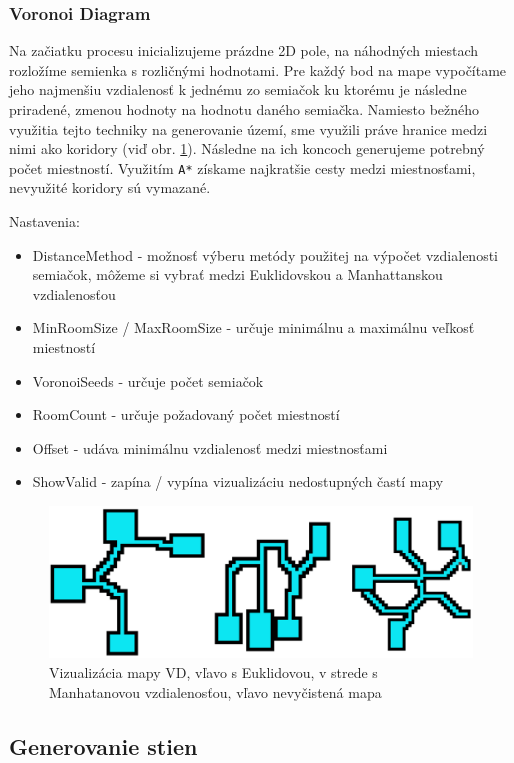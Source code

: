 \subsubsection*{Voronoi Diagram}

Na začiatku procesu inicializujeme prázdne 2D pole, na náhodných miestach rozložíme semienka s rozličnými hodnotami. Pre každý bod na mape vypočítame jeho najmenšiu vzdialenosť k jednému zo semiačok ku ktorému je následne priradené, zmenou hodnoty na hodnotu daného semiačka. Namiesto bežného využitia tejto techniky na generovanie území, sme využili práve hranice medzi nimi ako koridory (viď obr. \ref{fig:vd}). Následne na ich koncoch generujeme potrebný počet miestností. Využitím \verb|A*| získame najkratšie cesty medzi miestnosťami, nevyužité koridory sú vymazané.

\noindent Nastavenia:

\begin{itemize}
    \item DistanceMethod - možnosť výberu metódy použitej na výpočet vzdialenosti semiačok, môžeme si vybrať medzi Euklidovskou a Manhattanskou vzdialenosťou
    \item MinRoomSize / MaxRoomSize - určuje minimálnu a maximálnu veľkosť miestností
    \item VoronoiSeeds - určuje počet semiačok
    \item RoomCount - určuje požadovaný počet miestností
    \item Offset - udáva minimálnu vzdialenosť medzi miestnosťami
    \item ShowValid - zapína / vypína vizualizáciu nedostupných častí mapy
\end{itemize}

\begin{figure} [H]
    \centering
    \includegraphics[width=0.7\linewidth]{obrazky-figures/vd.png}
    \caption{Vizualizácia mapy VD, vľavo s Euklidovou, v strede s Manhatanovou vzdialenosťou, vľavo nevyčistená mapa}
    \label{fig:vd}
\end{figure}

\subsection{Generovanie stien}

